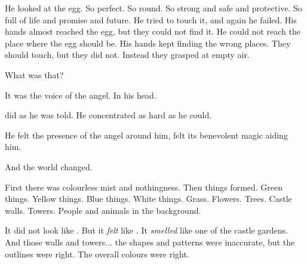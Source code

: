 
He looked at the egg. 
So perfect. 
So round. 
So strong and safe and protective. 
So full of life and promise and future. 
He tried to touch it, and again he failed. 
His hands almost reached the egg, but they could not find it. 
He could not reach the place where the egg should be. 
His hands kept finding the wrong places. 
They should touch, but they did not. 
Instead they grasped at empty air. 








\begin{comment}
\subsection{\Icor{} in \ps{\Tiroco}{} dream}
\end{comment}

What was that?

It was the voice of the angel.
In his head. 





\Icor{} did as he was told. 
He concentrated as hard as he could. 

He felt the presence of the angel around him, felt its benevolent magic aiding him. 

And the world changed. 

First there was colourless mist and nothingness. 
Then things formed. 
Green things. 
Yellow things. 
Blue things. 
White things. 
Grass. 
Flowers. 
Trees. 
Castle walls. 
Towers. 
People and animals in the background. 


It did not look like \CastlePelidor. 
But it \emph{felt} like \CastlePelidor. 
It \emph{smelled} like one of the castle gardens. 
And those walls and towers... the shapes and patterns were inaccurate, but the outlines were right. 
The overall colours were right. 

